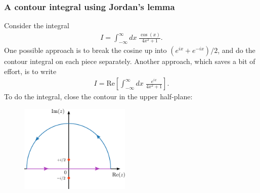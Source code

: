 \documentclass[10pt,a4paper]{article}
\begin{document}
\subsubsection{A contour integral using Jordan's lemma}
\label{a-contour-integral-using-jordans-lemma}

Consider the integral
\begin{align}
  I = \int_{-\infty}^\infty dx\; \frac{\cos(x)}{4x^2 + 1}.
\end{align}
One possible approach is to break the cosine up into $(e^{ix} +
e^{-ix})/2$, and do the contour integral on each piece separately.
Another approach, which saves a bit of effort, is to write
\begin{align}
  I = \mathrm{Re} \left[ \int_{-\infty}^\infty dx\; \frac{e^{ix}}{4x^2 + 1}\right].
\end{align}
To do the integral, close the contour in the upper half-plane:

\begin{figure}[ht]
  \centering\includegraphics[width=0.47\textwidth]{contour_example3}
\end{figure}
\end{document}
